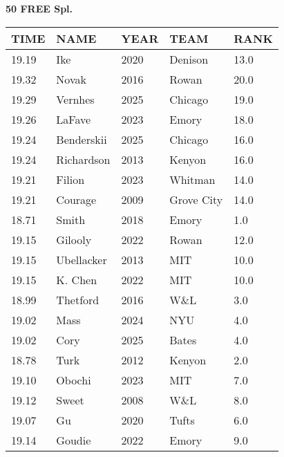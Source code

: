 \begin{table}[H]
\centering
\begin{minipage}[t]{0.6\textwidth}
\centering
\textbf{50 FREE Spl.}\\[0.1cm]
\begin{tabular}{@{}p{1.8cm}p{2.8cm}p{1.2cm}p{1.4cm}p{0.8cm}@{}}
\hline
    \textbf{TIME} & \textbf{NAME} & \textbf{YEAR} & \textbf{TEAM} & \textbf{RANK} \\
\hline
    19.19 & Ike & 2020 & Denison & 13.0 \\
    19.32 & Novak & 2016 & Rowan & 20.0 \\
    19.29 & Vernhes & 2025 & Chicago & 19.0 \\
    19.26 & LaFave & 2023 & Emory & 18.0 \\
    19.24 & Benderskii & 2025 & Chicago & 16.0 \\
    19.24 & Richardson & 2013 & Kenyon & 16.0 \\
    19.21 & Filion & 2023 & Whitman & 14.0 \\
    19.21 & Courage & 2009 & Grove City & 14.0 \\
    18.71 & Smith & 2018 & Emory & 1.0 \\
    19.15 & Gilooly & 2022 & Rowan & 12.0 \\
    19.15 & Ubellacker & 2013 & MIT & 10.0 \\
    19.15 & K. Chen & 2022 & MIT & 10.0 \\
    18.99 & Thetford & 2016 & W\&L & 3.0 \\
    19.02 & Mass & 2024 & NYU & 4.0 \\
    19.02 & Cory & 2025 & Bates & 4.0 \\
    18.78 & Turk & 2012 & Kenyon & 2.0 \\
    19.10 & Obochi & 2023 & MIT & 7.0 \\
    19.12 & Sweet & 2008 & W\&L & 8.0 \\
    19.07 & Gu & 2020 & Tufts & 6.0 \\
    19.14 & Goudie & 2022 & Emory & 9.0 \\
\hline
\end{tabular}
\end{minipage}
\end{table}

